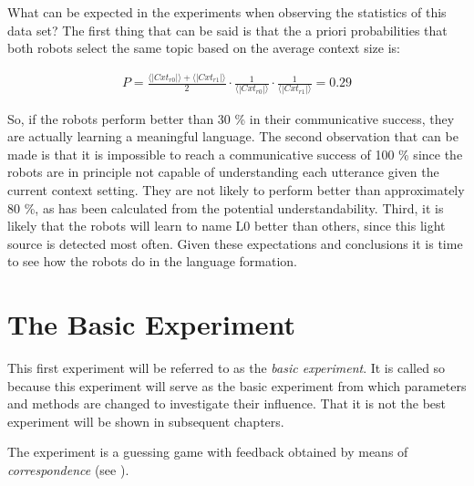 What can be expected in the experiments when observing the statistics of this data set? The first thing that can be said is that the a priori probabilities that both robots select the same topic based on the average context size is:

\begin{eqnarray*}
P=\frac{\langle|Cxt_{r0}|\rangle+\langle|Cxt_{r1}|\rangle}{2}\cdot \frac{1}{\langle|Cxt_{r0}|\rangle} \cdot \frac{1}{\langle|Cxt_{r1}|\rangle}=0.29
\end{eqnarray*}


So, if the robots perform better than 30 \% in their communicative success, they are actually learning a meaningful language. The second observation that can be made is that it is impossible to reach a communicative success of 100 \% since the robots are in principle not capable of understanding each utterance given the current context setting. They are not likely to perform better than approximately 80 \%, as has been calculated from the potential understandability. Third, it is likely that the robots will learn to name L0 better than others, since this light source is detected most often. Given these expectations and conclusions it is time to see how the robots do in the language formation.


\section{The Basic Experiment}\label{s:st:experiment}

This first experiment will be referred to as the {\em basic experiment}. It is called so because this experiment will serve as the basic experiment from which parameters and methods are changed to investigate their influence. That it is not the best experiment will be shown in subsequent chapters.


The experiment is a guessing game with feedback obtained by means of {\em correspondence} (see ). 

